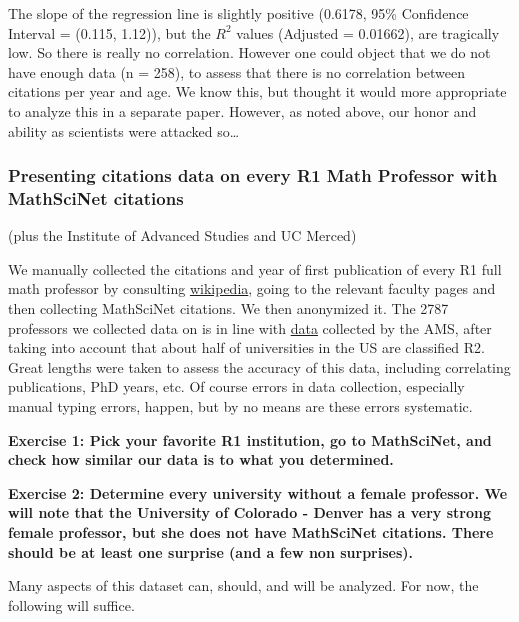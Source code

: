 \documentclass[]{article}
\begin{document}
The slope of the regression line is slightly positive (0.6178, 95\%
Confidence Interval = (0.115, 1.12)), but the \(R^2\) values (Adjusted =
0.01662), are tragically low. So there is really no correlation. However
one could object that we do not have enough data (n = 258), to assess
that there is no correlation between citations per year and age. We know
this, but thought it would more appropriate to analyze this in a
separate paper. However, as noted above, our honor and ability as
scientists were attacked so\ldots{}

\hypertarget{presenting-citations-data-on-every-r1-math-professor-with-mathscinet-citations}{%
\subsubsection{Presenting citations data on every R1 Math Professor with
MathSciNet
citations}\label{presenting-citations-data-on-every-r1-math-professor-with-mathscinet-citations}}

(plus the Institute of Advanced Studies and UC Merced)

We manually collected the citations and year of first publication of
every R1 full math professor by consulting
\href{https://en.wikipedia.org/wiki/List_of_research_universities_in_the_United_States}{wikipedia},
going to the relevant faculty pages and then collecting MathSciNet
citations. We then anonymized it. The 2787 professors we collected data
on is in line with
\href{http://www.ams.org/profession/data/annual-survey/2016dp-tableDF1.pdf?fbclid=IwAR1mgI0qSEs5nCGquqye741_0lZU-ez7dlcJ3wZYhDtJUswhH1SX7yeiiak}{data}
collected by the AMS, after taking into account that about half of
universities in the US are classified R2. Great lengths were taken to
assess the accuracy of this data, including correlating publications,
PhD years, etc. Of course errors in data collection, especially manual
typing errors, happen, but by no means are these errors systematic.

\textbf{Exercise 1: Pick your favorite R1 institution, go to MathSciNet,
and check how similar our data is to what you determined.}

\textbf{Exercise 2: Determine every university without a female
professor. We will note that the University of Colorado - Denver has a
very strong female professor, but she does not have MathSciNet
citations. There should be at least one surprise (and a few non
surprises).}

Many aspects of this dataset can, should, and will be analyzed. For now,
the following will suffice.
\end{document}
